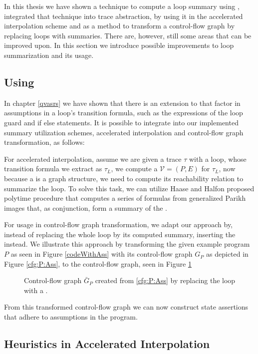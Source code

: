 
In this thesis we have shown a technique to compute a loop summary using \qvasr, integrated that technique into trace abstraction, by using it in the accelerated interpolation scheme and as a method to transform a control-flow graph by replacing loops with summaries. There are, however, still some areas that can be improved upon. In this section we introduce possible improvements to \qvasr loop summarization and its usage. \\ \par
\subsection{Using \qvasrs}
In chapter \ref{qvasrs} we have shown that there is an extension to \qvasr that factor in assumptions in a loop's transition formula, such as the expressions of the loop guard and if else statements. It is possible to integrate \qvasrs into our implemented summary utilization schemes, accelerated interpolation and control-flow graph transformation, as follows: \\ \par
For accelerated interpolation, assume we are given a trace $\tau$ with a loop, whose transition formula we extract as $\tau_L$, we compute a \qvasrs $\mathcal{V} = (P, E)$ for $\tau_L$, now because a \qvasrs is a graph structure, we need to compute its reachability relation to summarize the loop. To solve this task, we can utilize Haase and Halfon \cite{DBLP:conf/rp/HaaseH14} proposed polytime procedure that computes a series of formulas from generalized Parikh images that, as conjunction, form a summary of the \qvasrs. \\ \par
For \qvasrs usage in control-flow graph transformation, we adapt our approach by, instead of replacing the whole loop by its computed summary, inserting the \qvasrs instead. We illustrate this approach by transforming the given example program $P$ as seen in Figure \ref{codeWithAss} with its control-flow graph $G_P$ as depicted in Figure \ref{cfg:P:Ass}, to the control-flow graph, seen in Figure \ref{qvasrs_cfg}
\begin{figure}[H]
	
	\label{qvasrs_cfg}
	\caption{Control-flow graph $\bar{G}_P$ created from \ref{cfg:P:Ass} by replacing the loop with a \qvasrs.}
\end{figure}
From this transformed control-flow graph we can now construct state assertions that adhere to assumptions in the program.
\subsection{Heuristics in Accelerated Interpolation}

\begin{comment}
	To compute a loop summary from a \qvasrs, one has to calculate the reachability relation of the automaton. Haase and Halfon \cite{DBLP:conf/rp/HaaseH14} proposed a polytime procedure that computes a series of formulas from computed Parikh images that, as conjunction, form a summary of the system. This procedure can be adapted to work with \qvasrs
\end{comment}
